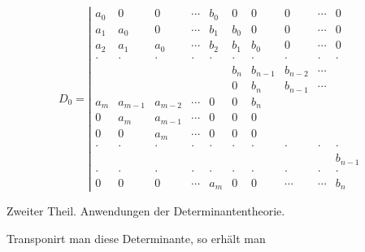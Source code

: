 \[
D_0 = \left|
\begin{array}{cccccccccc}
a_0 & 0 & 0 & \cdots & b_0 & 0 & 0 & 0 & \cdots & 0\\
a_1 & a_0 & 0 & \cdots & b_1 & b_0 & 0 & 0 & \cdots & 0\\
a_2 & a_1 & a_0 & \cdots & b_2 & b_1 & b_0 & 0 & \cdots & 0\\
\cdot & \cdot & \cdot & \cdot & \cdot & \cdot & \cdot & \cdot & \cdot & \cdot\\
 & & & & & b_n & b_{n-1} & b_{n-2} & \cdots & \\
 & & & & & 0 & b_n & b_{n-1} & \cdots & \\
a_m & a_{m-1} & a_{m-2} & \cdots & 0 & 0 & b_n & & & \\
0 & a_m & a_{m-1} & \cdots & 0 & 0 & 0 & & & \\
0 & 0 & a_m & \cdots & 0 & 0 & 0 & & & \\
\cdot & \cdot & \cdot & \cdot & \cdot & \cdot & \cdot & \cdot & \cdot & \cdot\\
 & & & & & & & & & b_{n-1}\\
\cdot & \cdot & \cdot & \cdot & \cdot & \cdot & \cdot & \cdot & \cdot & \cdot\\
0 & 0 & 0 & \cdots & a_m & 0 & 0 & \cdots & \cdots & b_n
\end{array}
\right.
\]


Zweiter Theil. Anwendungen der Determinantentheorie.

Transponirt man diese Determinante, so erhält man

